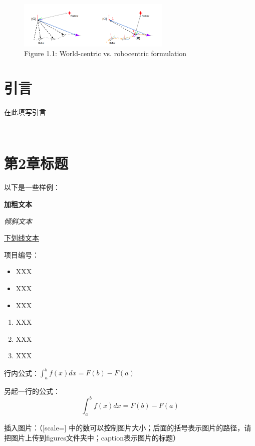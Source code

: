\documentclass[a4paper, UTF8, fontset=adobe]{ctexart}
\begin{document}
	
\tableofcontents

\thispagestyle{empty}

\newpage

\begin{figure}
\centering
\includegraphics[width=0.65\textwidth]{figures/robocentric formulation illustration.png}
\captionsetup{labelformat=empty}
\caption{Figure 1.1: World-centric vs. robocentric formulation}
\end{figure}

\section{引言}

在此填写引言

\

\section{第2章标题}

以下是一些样例：

\textbf{加粗文本}

\textit{倾斜文本}

\underline{下划线文本}

项目编号：

\begin{itemize}
    \item XXX
    \item XXX
    \item XXX
\end{itemize}

\begin{enumerate}
    \item XXX
    \item XXX
    \item XXX
\end{enumerate}

行内公式：$\int_a^b f(x)dx = F(b)-F(a)$

另起一行的公式：
\begin{equation}
    \int_a^b f(x)dx = F(b)-F(a)
\end{equation}

插入图片：（[scale=] 中的数可以控制图片大小；后面的括号表示图片的路径，请把图片上传到figures文件夹中；caption表示图片的标题）
\end{document}
